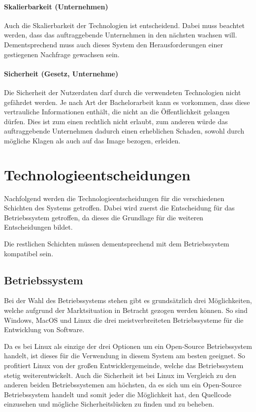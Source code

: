 \paragraph{Skalierbarkeit (Unternehmen)}\label{par:skalierbarkeit}
Auch die Skalierbarkeit der Technologien ist entscheidend.
Dabei muss beachtet werden, dass das auftraggebende
Unternehmen in den nächsten wachsen will.
Dementsprechend muss auch dieses System den
Herausforderungen einer gestiegenen Nachfrage gewachsen sein.

\paragraph{Sicherheit (Gesetz, Unternehme)}\label{par:sicherheit}
Die Sicherheit der Nutzerdaten darf durch die verwendeten Technologien nicht gefährdet werden.
Je nach Art der Bachelorarbeit kann es vorkommen, dass diese vertrauliche Informationen enthält,
die nicht an die Öffentlichkeit gelangen dürfen.
Dies ist zum einen rechtlich nicht erlaubt, zum anderen würde das auftraggebende Unternehmen
dadurch einen erheblichen Schaden, sowohl durch mögliche Klagen als auch auf das Image bezogen, erleiden.

\section{Technologieentscheidungen}\label{sec:technologieentscheidungen}
Nachfolgend werden die Technologieentscheidungen für die verschiedenen Schichten des Systems getroffen.
Dabei wird zuerst die Entscheidung für das Betriebssystem getroffen,
da dieses die Grundlage für die weiteren Entscheidungen bildet.

Die restlichen Schichten müssen dementsprechend mit dem Betriebssystem kompatibel sein.

\subsection{Betriebssystem}\label{subsec:betriebssystem}
Bei der Wahl des Betriebssystems stehen gibt es grundsätzlich drei Möglichkeiten,
welche aufgrund der Marktsituation in Betracht gezogen werden können.
So sind Windows, MacOS und Linux die drei meistverbreiteten Betriebssysteme für die Entwicklung von Software\autocite{JetBrains-2023}.

Da es bei Linux als einzige der drei Optionen um ein Open-Source Betriebssystem handelt,
ist dieses für die Verwendung in diesem System am besten geeignet.
So profitiert Linux von der großen Entwicklergemeinde, welche das Betriebssystem stetig weiterentwickelt.
Auch die Sicherheit ist bei Linux im Vergleich zu den anderen beiden Betriebssystemen am höchsten,
da es sich um ein Open-Source Betriebssystem handelt und somit jeder die Möglichkeit hat,
den Quellcode einzusehen und mögliche Sicherheitslücken zu finden und zu beheben.

